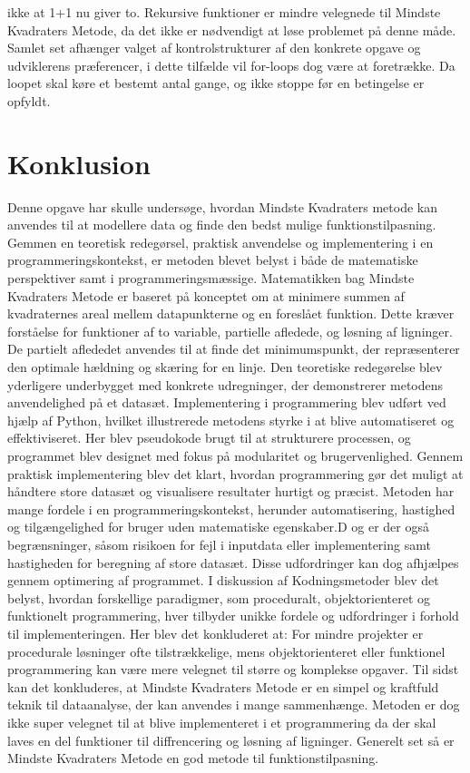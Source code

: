 ikke at 1+1 nu giver to. Rekursive funktioner er mindre velegnede til Mindste Kvadraters Metode, da det ikke er nødvendigt at løse problemet på denne måde. Samlet set afhænger valget af kontrolstrukturer af den konkrete opgave og udviklerens præferencer, i dette tilfælde vil for-loops dog være at foretrække. Da loopet skal køre et bestemt antal gange, og ikke stoppe før en betingelse er opfyldt.

\section{Konklusion}
Denne opgave har skulle undersøge, hvordan Mindste Kvadraters metode kan anvendes til at modellere data og finde den bedst mulige funktionstilpasning. Gemmen en teoretisk redegørsel, praktisk anvendelse og implementering i en programmeringskontekst, er metoden blevet belyst i både de matematiske perspektiver samt i programmeringsmæssige. Matematikken bag Mindste Kvadraters Metode er baseret på konceptet om at minimere summen af kvadraternes areal mellem datapunkterne og en foreslået funktion. Dette kræver forståelse for funktioner af to variable, partielle afledede, og løsning af ligninger. De partielt aflededet anvendes til at finde det minimumspunkt, der repræsenterer den optimale hældning og skæring for en linje. Den teoretiske redegørelse blev yderligere underbygget med konkrete udregninger, der demonstrerer metodens anvendelighed på et datasæt. Implementering i programmering blev udført ved hjælp af Python, hvilket illustrerede metodens styrke i at blive automatiseret og effektiviseret. Her blev pseudokode brugt til at strukturere processen, og programmet blev designet med fokus på modularitet og brugervenlighed. Gennem praktisk implementering blev det klart, hvordan programmering gør det muligt at håndtere store datasæt og visualisere resultater hurtigt og præcist. Metoden har mange fordele i en programmeringskontekst, herunder automatisering, hastighed og tilgængelighed for bruger uden matematiske egenskaber.D og er der også begrænsninger, såsom risikoen for fejl i inputdata eller implementering samt hastigheden for beregning af store datasæt. Disse udfordringer kan dog afhjælpes gennem optimering af programmet. I diskussion af Kodningsmetoder blev det belyst, hvordan forskellige paradigmer, som proceduralt, objektorienteret og funktionelt programmering, hver tilbyder unikke fordele og udfordringer i forhold til implementeringen. Her blev det konkluderet at: For mindre projekter er procedurale løsninger ofte tilstrækkelige, mens objektorienteret eller funktionel programmering kan være mere velegnet til større og komplekse opgaver. Til sidst kan det konkluderes, at Mindste Kvadraters Metode er en simpel og kraftfuld teknik til dataanalyse, der kan anvendes i mange sammenhænge. Metoden er dog ikke super velegnet til at blive implementeret i et programmering da der skal laves en del funktioner til diffrencering og løsning af ligninger. Generelt set så er Mindste Kvadraters Metode en god metode til funktionstilpasning.